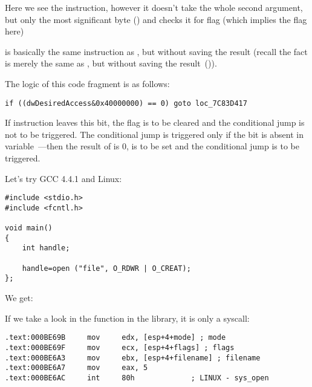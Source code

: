 Here we see the \TEST instruction, however it doesn't take the whole second argument,\\
but only the most significant byte () and checks it for flag 
(which implies the  flag here)

\TEST is basically the same instruction as \AND, but without saving the result
(recall the fact \CMP is merely the same as \SUB, but without saving the result~()).

The logic of this code fragment is as follows:

\begin{lstlisting}[style=customc]
if ((dwDesiredAccess&0x40000000) == 0) goto loc_7C83D417
\end{lstlisting}


If \AND instruction leaves this bit, the \ZF flag is to be cleared and the 
\JZ conditional jump is not to be triggered.
The conditional jump is triggered only if the  bit is absent in  variable~---then the result of \AND is 0,
\ZF is to be set and the conditional jump is to be triggered.

Let's try GCC 4.4.1 and Linux:

\begin{lstlisting}[style=customc]
#include <stdio.h>
#include <fcntl.h>

void main()
{
	int handle;

	handle=open ("file", O_RDWR | O_CREAT);
};
\end{lstlisting}

We get:




If we take a look in the  function in the  library, it is only a syscall:

\begin{lstlisting}[caption=open() (libc.so.6),style=customasmx86]
.text:000BE69B     mov     edx, [esp+4+mode] ; mode
.text:000BE69F     mov     ecx, [esp+4+flags] ; flags
.text:000BE6A3     mov     ebx, [esp+4+filename] ; filename
.text:000BE6A7     mov     eax, 5
.text:000BE6AC     int     80h             ; LINUX - sys_open
\end{lstlisting}


